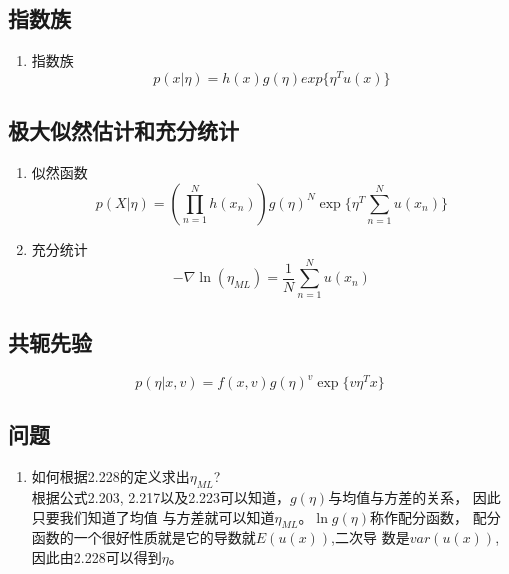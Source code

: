 \subsection{指数族}

\begin{enumerate}
\item 指数族
\begin{equation}
p(x|\eta) = h(x)g(\eta)exp\{\eta^Tu(x)\}
\end{equation}
\end{enumerate}

\subsection{极大似然估计和充分统计}

\begin{enumerate}
\item 似然函数
\begin{equation}
p(X|\eta) = (\prod_{n=1}^Nh(x_n))g(\eta)^N \exp \{
\eta^T \sum_{n=1}^N u(x_n)
\}
\end{equation}
\item 充分统计
\begin{equation}
-\nabla\ln(\eta_{ML}) = \frac{1}{N}\sum_{n=1}^N{u(x_n)}
\end{equation}
\end{enumerate}

\subsection{共轭先验}
\begin{equation}
p(\eta|x, v) = f(x, v)g(\eta)^v\exp\{v\eta^Tx\}
\end{equation}


\subsection{问题}
\begin{enumerate}
\item 如何根据2.228的定义求出$\eta_{ML}$?\\
根据公式2.203, 2.217以及2.223可以知道，$g(\eta)$与均值与方差的关系，
因此只要我们知道了均值
与方差就可以知道$\eta_{ML}$。$\ln g(\eta)$称作配分函数，
配分函数的一个很好性质就是它的导数就$E(u(x))$,二次导
数是$var(u(x))$,因此由2.228可以得到$\eta$。
\end{enumerate}
